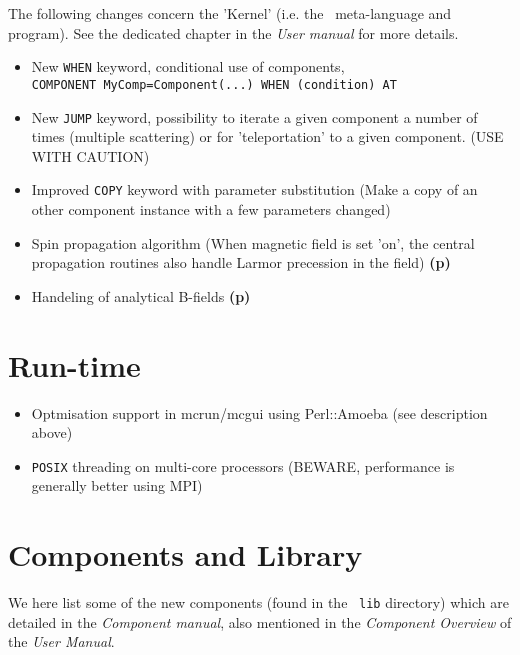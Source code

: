 The following changes concern the 'Kernel' (i.e. the \MCS\ meta-language and program). See the dedicated chapter in the {\it User manual} for more details.

\begin{itemize}
\item New \verb+WHEN+ keyword, conditional use of components,
  \\\verb+COMPONENT MyComp=Component(...) WHEN (condition) AT+
\item New \verb+JUMP+ keyword, possibility to iterate a given component a
  number of times (multiple scattering) or for 'teleportation' to a
  given component. (USE WITH CAUTION)
\item Improved \verb+COPY+ keyword with parameter substitution (Make a copy
  of an other component instance with a few parameters changed)
\item Spin propagation algorithm (When magnetic field is set 'on', the
  central propagation routines also handle Larmor precession in the field) {\bf(p)}
\item Handeling of analytical B-fields {\bf(p)}
\end{itemize}

\section{Run-time}
\label{s:new-features:run-time}

\begin{itemize}
\item Optmisation support in mcrun/mcgui using Perl::Amoeba (see description above)
\item \verb+POSIX+ threading on multi-core processors (BEWARE, performance is generally better using MPI)
\end{itemize}


\section{Components and Library}
\label{s:new-features:components}
 

We here list some of the new components (found in the \MCS\ \verb+lib+ directory)
which are detailed in the {\it Component manual}, also mentioned in
the {\it Component Overview} of the {\it User Manual}.
